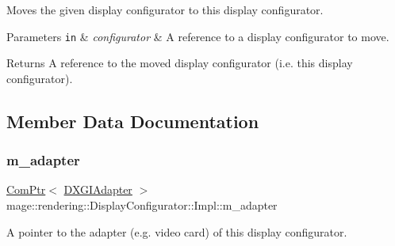 Moves the given display configurator to this display configurator.


\begin{DoxyParams}[1]{Parameters}
\mbox{\tt in}  & {\em configurator} & A reference to a display configurator to move. \\
\hline
\end{DoxyParams}
\begin{DoxyReturn}{Returns}
A reference to the moved display configurator (i.\+e. this display configurator). 
\end{DoxyReturn}


\subsection{Member Data Documentation}
\hypertarget{classmage_1_1rendering_1_1_display_configurator_1_1_impl_a49b407f044b7e34f9b58dbd86648bb46}{}\label{classmage_1_1rendering_1_1_display_configurator_1_1_impl_a49b407f044b7e34f9b58dbd86648bb46} 
\subsubsection{\texorpdfstring{m\+\_\+adapter}{m\_adapter}}
{\footnotesize\ttfamily \hyperlink{namespacemage_ae74f374780900893caa5555d1031fd79}{Com\+Ptr}$<$ \hyperlink{namespacemage_1_1rendering_ad55e028ebd705b547eeb972ad8d03b6a}{D\+X\+G\+I\+Adapter} $>$ mage\+::rendering\+::\+Display\+Configurator\+::\+Impl\+::m\+\_\+adapter\hspace{0.3cm}{\ttfamily [private]}}

A pointer to the adapter (e.\+g. video card) of this display configurator. \hypertarget{classmage_1_1rendering_1_1_display_configurator_1_1_impl_a445c59ccde512df51bb77b9aaa2ecb23}{}\label{classmage_1_1rendering_1_1_display_configurator_1_1_impl_a445c59ccde512df51bb77b9aaa2ecb23} 
